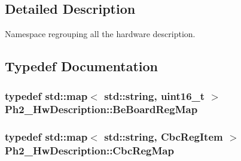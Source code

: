\subsection{Detailed Description}
Namespace regrouping all the hardware description. 

\subsection{Typedef Documentation}
\hypertarget{namespace_ph2___hw_description_a2e13fb82c8ed98154c60f9d0f8467d72}{
\subsubsection[{Be\-Board\-Reg\-Map}]{\setlength{\rightskip}{0pt plus 5cm}typedef std\-::map$<$ std\-::string, uint16\-\_\-t $>$ {\bf Ph2\-\_\-\-Hw\-Description\-::\-Be\-Board\-Reg\-Map}}}\label{namespace_ph2___hw_description_a2e13fb82c8ed98154c60f9d0f8467d72}
\hypertarget{namespace_ph2___hw_description_a9a23b373068f169aa67ca1d22c9a6001}{
\subsubsection[{Cbc\-Reg\-Map}]{\setlength{\rightskip}{0pt plus 5cm}typedef std\-::map$<$ std\-::string, {\bf Cbc\-Reg\-Item} $>$ {\bf Ph2\-\_\-\-Hw\-Description\-::\-Cbc\-Reg\-Map}}}\label{namespace_ph2___hw_description_a9a23b373068f169aa67ca1d22c9a6001}


